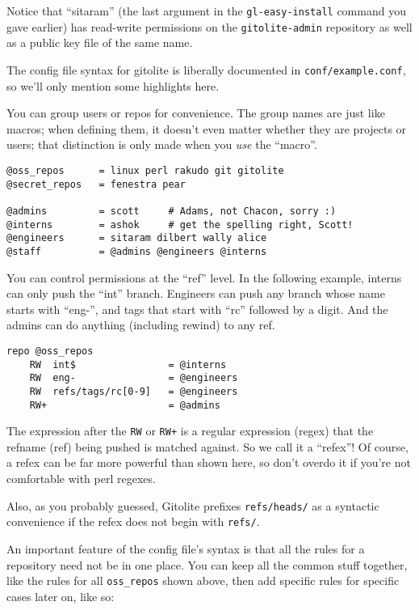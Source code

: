 \documentclass[a4paper]{book}
\newcounter{tab}[chapter]
\begin{document}
Notice that “sitaram” (the last argument in the \texttt{gl-easy-install} command you gave earlier) has read-write permissions on the \texttt{gitolite-admin} repository as well as a public key file of the same name.

The config file syntax for gitolite is liberally documented in \texttt{conf/example.conf}, so we'll only mention some highlights here.

You can group users or repos for convenience. The group names are just like macros; when defining them, it doesn't even matter whether they are projects or users; that distinction is only made when you \emph{use} the “macro”.

\begin{shaded}\begin{verbatim}
@oss_repos      = linux perl rakudo git gitolite
@secret_repos   = fenestra pear

@admins         = scott     # Adams, not Chacon, sorry :)
@interns        = ashok     # get the spelling right, Scott!
@engineers      = sitaram dilbert wally alice
@staff          = @admins @engineers @interns
\end{verbatim}\end{shaded}

You can control permissions at the “ref” level. In the following example, interns can only push the “int” branch. Engineers can push any branch whose name starts with “eng-”, and tags that start with “rc” followed by a digit. And the admins can do anything (including rewind) to any ref.

\begin{shaded}\begin{verbatim}
repo @oss_repos
    RW  int$                = @interns
    RW  eng-                = @engineers
    RW  refs/tags/rc[0-9]   = @engineers
    RW+                     = @admins
\end{verbatim}\end{shaded}

The expression after the \texttt{RW} or \texttt{RW+} is a regular expression (regex) that the refname (ref) being pushed is matched against. So we call it a “refex”! Of course, a refex can be far more powerful than shown here, so don't overdo it if you're not comfortable with perl regexes.

Also, as you probably guessed, Gitolite prefixes \texttt{refs/heads/} as a syntactic convenience if the refex does not begin with \texttt{refs/}.

An important feature of the config file's syntax is that all the rules for a repository need not be in one place. You can keep all the common stuff together, like the rules for all \texttt{oss\_repos} shown above, then add specific rules for specific cases later on, like so:
\end{document}
